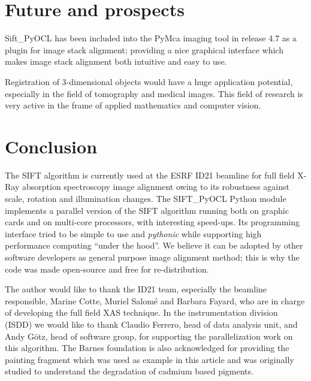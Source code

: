 \documentclass[preprint]{iucr}
\begin{document}
\section{Future and prospects}

Sift_PyOCL has been included into the PyMca imaging tool \cite{pymca} in release
4.7 as a plugin for image stack alignment; providing a nice graphical
interface which makes image stack alignment both intuitive and easy to use.

Registration of 3-dimensional objects would have a huge application potential,
especially in the field of tomography and medical images.
This field of research is very active in the frame of applied mathematics and
computer vision.


\section{Conclusion}

The SIFT algorithm is currently used at the ESRF ID21 beamline for full field
X-Ray absorption spectroscopy image alignment owing to its robustness against
scale, rotation and illumination changes.
The SIFT\_PyOCL Python module implements a parallel version of the SIFT
algorithm running both on graphic cards and on multi-core processors, with
interesting speed-ups.
Its programming interface tried to be simple to use and \emph{pythonic} while
supporting high performance computing ``under the hood''.
We believe it can be adopted by other software developers as general purpose
image alignment method; this is why the code was made open-source and free for
re-distribution.



The author would like to thank the ID21 team, especially the beamline
responsible, Marine Cotte, Muriel Salomé and Barbara Fayard, who are in charge
of developing the full field XAS technique.
In the instrumentation division (ISDD) we would like to thank Claudio Ferrero,
head of data analysis unit, and Andy G\"otz, head of software group, for
supporting the parallelization work on this algorithm.
The Barnes foundation is also acknowledged for providing the painting fragment
which was used as example in this article and was originally studied to
understand the degradation of cadmium based pigments.


\end{document}
